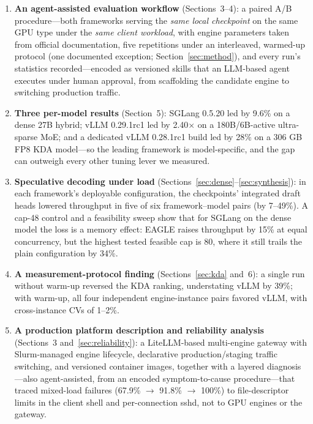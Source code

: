 \documentclass[11pt]{article}
\begin{document}
\begin{enumerate}
\item \textbf{An agent-assisted evaluation workflow} (Sections~3--4): a paired A/B procedure---both frameworks serving the \emph{same local checkpoint} on the same GPU type under the \emph{same client workload}, with engine parameters taken from official documentation, five repetitions under an interleaved, warmed-up protocol (one documented exception; Section~\ref{sec:method}), and every run's statistics recorded---encoded as versioned skills that an LLM-based agent executes under human approval, from scaffolding the candidate engine to switching production traffic.
\item \textbf{Three per-model results} (Section~5): SGLang 0.5.20 led by 9.6\% on a dense 27B hybrid; vLLM 0.29.1rc1 led by 2.40$\times$ on a 180B/6B-active ultra-sparse MoE; and a dedicated vLLM 0.28.1rc1 build led by 28\% on a 306 GB FP8 KDA model---so the leading framework is model-specific, and the gap can outweigh every other tuning lever we measured.
\item \textbf{Speculative decoding under load} (Sections~\ref{sec:dense}--\ref{sec:synthesis}): in each framework's deployable configuration, the checkpoints' integrated draft heads lowered throughput in five of six framework--model pairs (by 7--49\%). A cap-48 control and a feasibility sweep show that for SGLang on the dense model the loss is a memory effect: EAGLE raises throughput by 15\% at equal concurrency, but the highest tested feasible cap is 80, where it still trails the plain configuration by 34\%.
\item \textbf{A measurement-protocol finding} (Sections~\ref{sec:kda} and~6): a single run without warm-up reversed the KDA ranking, understating vLLM by 39\%; with warm-up, all four independent engine-instance pairs favored vLLM, with cross-instance CVs of 1--2\%.
\item \textbf{A production platform description and reliability analysis} (Sections~3 and~\ref{sec:reliability}): a LiteLLM-based multi-engine gateway with Slurm-managed engine lifecycle, declarative production/staging traffic switching, and versioned container images, together with a layered diagnosis---also agent-assisted, from an encoded symptom-to-cause procedure---that traced mixed-load failures (67.9\% $\rightarrow$ 91.8\% $\rightarrow$ 100\%) to file-descriptor limits in the client shell and per-connection sshd, not to GPU engines or the gateway.
\end{enumerate}
\end{document}

